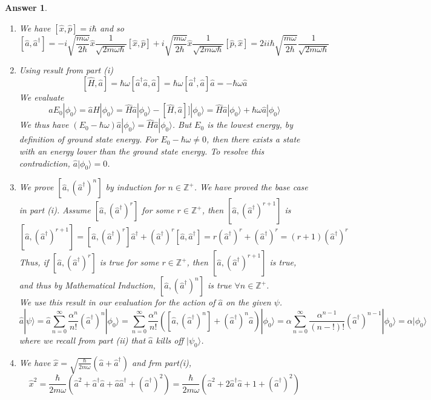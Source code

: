 \documentclass[a4paper]{article}
\newtheorem{ans}{Answer}[subsection]
\theoremstyle{new}
\begin{document}
\begin{ans}\leavevmode
\begin{enumerate}[label=(\roman*)]
\item We have $[\hat{x},\hat{p}]=i\hbar$ and so
$$[\hat{a},\hat{a}^\dag]=-i\sqrt{\frac{m\omega}{2\hbar}}\hat{x}\frac{1}{\sqrt{2m\omega\hbar}}[\hat{x},\hat{p}]+i\sqrt{\frac{m\omega}{2\hbar}}\hat{x}\frac{1}{\sqrt{2m\omega\hbar}}[\hat{p},\hat{x}]=2ii\hbar\sqrt{\frac{m\omega}{2\hbar}}\frac{1}{\sqrt{2m\omega\hbar}}$$
\item Using result from part (i)
$$[\hat{H},\hat{a}]=\hbar\omega[\hat{a}^\dag\hat{a},\hat{a}]=\hbar\omega[\hat{a}^\dag,\hat{a}]\hat{a}=-\hbar\omega\hat{a}$$
We evaluate
$$\hat{a}E_0|\phi_0\rangle=\hat{a}\hat{H}|\phi_0\rangle=\hat{H}\hat{a}|\phi_0\rangle-[\hat{H},\hat{a}]]|\phi_0\rangle=\hat{H}\hat{a}|\phi_0\rangle+\hbar\omega\hat{a}|\phi_0\rangle$$
We thus have $(E_0-\hbar\omega)\hat{a}|\phi_0\rangle=\hat{H}\hat{a}|\phi_0\rangle$. But $E_0$ is the lowest energy, by definition of ground state energy. For $E_0-\hbar\omega\neq0$, then there exists a state with an energy lower than the ground state energy. To resolve this contradiction, $\hat{a}|\phi_0\rangle=0$.
\item We prove $[\hat{a},(\hat{a}^\dag)^n]$ by induction for $n\in\mathbb{Z}^+$. We have proved the base case in part (i). Assume $[\hat{a},(\hat{a}^\dag)^r]$ for some $r\in\mathbb{Z}^+$, then $[\hat{a},(\hat{a}^\dag)^{r+1}]$ is
$$[\hat{a},(\hat{a}^\dag)^{r+1}]=[\hat{a},(\hat{a}^\dag)^{r}]\hat{a}^\dag+(\hat{a}^\dag)^r[\hat{a},\hat{a}^\dag]=r(\hat{a}^\dag)^r+(\hat{a}^\dag)^r=(r+1)(\hat{a}^\dag)^r$$
Thus, if $[\hat{a},(\hat{a}^\dag)^r]$ is true for some $r\in\mathbb{Z}^+$, then $[\hat{a},(\hat{a}^\dag)^{r+1}]$ is true, and thus by Mathematical Induction, $[\hat{a},(\hat{a}^\dag)^n]$ is true $\forall n\in\mathbb{Z}^+$.\\[5pt]
We use this result in our evaluation for the action of $\hat{a}$ on the given $\psi$.
$$\hat{a}|\psi\rangle=\hat{a}\sum_{n=0}^\infty\frac{\alpha^n}{n!}(\hat{a}^\dag)^n|\phi_0\rangle=\sum_{n=0}^\infty\frac{\alpha^n}{n!}([\hat{a},(\hat{a}^\dag)^n]+(\hat{a}^\dag)^n\hat{a})|\phi_0\rangle=\alpha\sum_{n=0}^\infty\frac{\alpha^{n-1}}{(n-!)!}(\hat{a}^\dag)^{n-1}|\phi_0\rangle=\alpha|\phi_0\rangle$$
where we recall from part (ii) that $\hat{a}$ kills off $|\psi_0\rangle$.
\item We have $\hat{x}=\sqrt{\frac{\hbar}{2m\omega}}(\hat{a}+\hat{a}^\dag)$ and frm part(i),
$$\hat{x}^2=\frac{\hbar}{2m\omega}(\hat{a}^2+\hat{a}^\dag\hat{a}+\hat{a}\hat{a}^\dag+(\hat{a}^\dag)^2)=\frac{\hbar}{2m\omega}(\hat{a}^2+2\hat{a}^\dag\hat{a}+1+(\hat{a}^\dag)^2)$$

\end{enumerate}
\end{ans}
\end{document}
